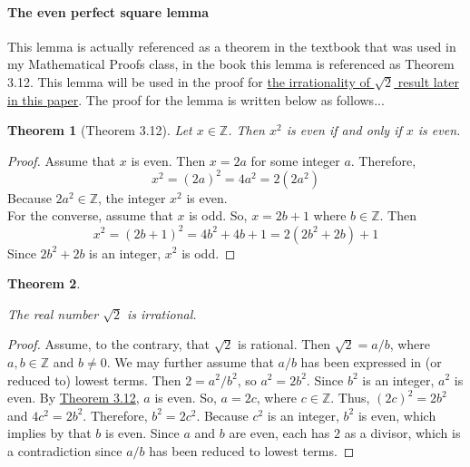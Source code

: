 \documentclass{turabian-researchpaper}
\newtheorem*{theorem*}{Theorem}
\begin{document}
\paragraph{The even perfect square lemma}

This lemma is actually referenced as a theorem in the textbook that was used in my Mathematical Proofs class, in the book this lemma is referenced as Theorem 3.12. This lemma will be used in the proof for \hyperlink{Ping Zhang's proof}{the irrationality of \(\sqrt{2}\) result later in this paper}. The proof for the lemma is written below as follows... 

\begin{theorem*}[Theorem 3.12]\cite[p.$\Tilde{91}$]{Zhang2018}\hypertarget{Theorem 3.12}{}
    Let \(x \in \mathds{Z}\). Then \(x^2\) is even if and only if \(x\) is even. 
\end{theorem*} 

\begin{proof}
    Assume that \(x\) is even. Then \(x = 2a\) for some integer \(a\). Therefore, $$x^2 = (2a)^2 = 4a^2 = 2(2a^2)$$  Because \(2a^2 \in \mathds{Z}\), the integer \(x^2\) is even. \\  
     For the converse, assume that \(x\) is odd. So, \(x = 2b + 1\) where \(b \in \mathds{Z}\). Then \[x^2 = (2b +1)^2 = 4b^2 + 4b +1 = 2(2b^2 + 2b) + 1\] Since \(2b^2 + 2b\) is an integer, \(x^2\) is odd.  
\end{proof}


\begin{theorem*}\hypertarget{Ping Zhang's proof}{}\cite[p.$\Tilde{136}$]{Zhang2018}
    The real number \(\sqrt{2}\) is irrational. 
\end{theorem*} 

\begin{proof}
    Assume, to the contrary, that \(\sqrt{2}\) is rational. Then \(\sqrt{2} = a/b\), where \(a,b \in \mathds{Z}\) and \(b \neq 0\). We may further assume that \(a/b\) has been expressed in (or reduced to) lowest terms. Then \(2 = a^2/b^2\), so \(a^2 = 2b^2\). Since \(b^2\) is an integer, \(a^2\) is even. By \hyperlink{Theorem 3.12}{Theorem 3.12}, \(a\) is even. So, \(a = 2c\), where \(c \in \mathds{Z}\). Thus, \((2c)^2 = 2b^2\) and \(4c^2 = 2b^2\). Therefore, \(b^2 = 2c^2\). Because \(c^2\) is an integer, \(b^2\) is even, which implies by that \(b\) is even. Since \(a\) and \(b\) are even, each has \(2\) as a divisor, which is a contradiction since \(a/b\) has been reduced to lowest terms.  
\end{proof}
\end{document}
